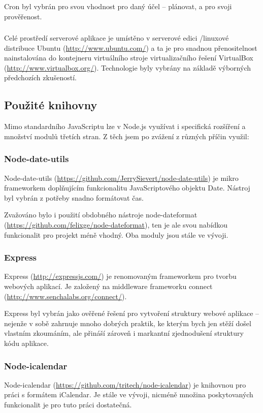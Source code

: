 Cron byl vybrán pro svou vhodnost pro daný účel -- plánovat, a pro svoji prověřenost.

\subsubsection*{ }
Celé prostředí serverové aplikace je umístěno v serverové edici /linuxové distribuce Ubuntu (\url{http://www.ubuntu.com/}) a ta je pro snadnou přenositelnost nainstalována do kontejneru virtuálního stroje virtualizačního řešení VirtualBox (\url{http://www.virtualbox.org/}). Technologie byly vybrány na základě výborných předchozích zkušeností.

\subsection{Použité knihovny}
\label{sec:server:libs}
Mimo standardního JavaScriptu lze v Node.js využívat i specifická rozšíření a množství modulů třetích stran. Z těch jsem po zvážení z různých příčin využil:

\subsubsection{Node-date-utils}
Node-date-utils (\url{https://github.com/JerrySievert/node-date-utils}) je mikro frameworkem doplňujícím funkcionalitu JavaScriptového objektu Date. Nástroj byl vybrán z potřeby snadno formátovat čas.

Zvažováno bylo i použití obdobného nástroje node-dateformat (\url{https://github.com/felixge/node-dateformat}), ten je ale svou nabídkou funkcionalit pro projekt méně vhodný. Oba moduly jsou stále ve vývoji.

\subsubsection{Express}
Express (\url{http://expressjs.com/}) je renomovaným frameworkem pro tvorbu webových aplikací. Je založený na middleware frameworku connect (\url{http://www.senchalabs.org/connect/}).

Express byl vybrán jako ověřené řešení pro vytvoření struktury webové aplikace -- nejenže v sobě zahrnuje mnoho dobrých praktik, ke kterým bych jen stěží došel vlastním zkoumáním, ale přináší zároveň i markantní zjednodušení struktury kódu aplikace.

\subsubsection{Node-icalendar}
Node-icalendar (\url{https://github.com/tritech/node-icalendar}) je knihovnou pro práci s formátem iCalendar. Je stále ve vývoji, nicméně množina poskytovaných funkcionalit je pro tuto práci dostatečná.

